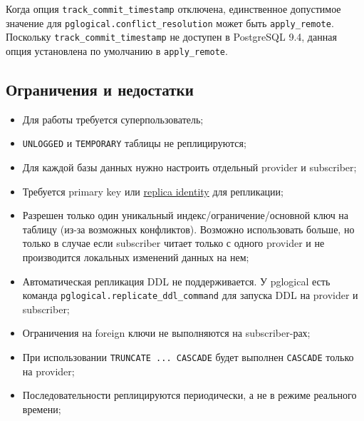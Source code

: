 Когда опция \lstinline!track_commit_timestamp! отключена, единственное допустимое значение для \lstinline!pglogical.conflict_resolution! может быть \lstinline!apply_remote!. Поскольку \lstinline!track_commit_timestamp! не доступен в PostgreSQL 9.4, данная опция установлена по умолчанию в \lstinline!apply_remote!.



\subsection{Ограничения и недостатки}

\begin{itemize}
  \item Для работы требуется суперпользователь;
  \item \lstinline!UNLOGGED! и \lstinline!TEMPORARY! таблицы не реплицируются;
  \item Для каждой базы данных нужно настроить отдельный provider и subscriber;
  \item Требуется primary key или \href{http://www.postgresql.org/docs/current/static/sql-altertable.html#SQL-CREATETABLE-REPLICA-IDENTITY}{replica identity} для репликации;
  \item Разрешен только один уникальный индекс/ограничение/основной ключ на таблицу (из-за возможных конфликтов). Возможно использовать больше, но только в случае если subscriber читает только с одного provider и не производится локальных изменений данных на нем;
  \item Автоматическая репликация DDL не поддерживается. У pglogical есть команда \lstinline!pglogical.replicate_ddl_command! для запуска DDL на provider и subscriber;
  \item Ограничения на foreign ключи не выполняются на subscriber-рах;
  \item При использовании \lstinline!TRUNCATE ... CASCADE! будет выполнен \lstinline!CASCADE! только на provider;
  \item Последовательности реплицируются периодически, а не в режиме реального времени;
\end{itemize}


